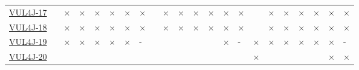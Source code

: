 \begin{table}[!htbp]
{\begin{tabular}{|l|lll|ll|ll||lll|ll|ll||lll|ll|ll|}
		\href{https://github.com/apache/httpcomponents-client/commit/0554271750599756d4946c0d7ba43d04b1a7b22}{VUL4J-17} & \cellcolor{green}\checkmark & \cellcolor{red}$\times$ & \cellcolor{red}$\times$ & \cellcolor{red}$\times$ & \cellcolor{red}$\times$ & \cellcolor{red}$\times$ & \cellcolor{red}$\times$  & \cellcolor{green}\checkmark & \cellcolor{red}$\times$ & \cellcolor{red}$\times$ & \cellcolor{red}$\times$ & \cellcolor{red}$\times$ & \cellcolor{red}$\times$ & \cellcolor{red}$\times$     & \cellcolor{green}\checkmark & \cellcolor{red}$\times$ & \cellcolor{red}$\times$ & \cellcolor{red}$\times$ & \cellcolor{red}$\times$ & \cellcolor{red}$\times$ & \cellcolor{red}$\times$\\ 
		\href{https://github.com/apache/jspwiki/commit/88d89d6523802c044cfcb7930cba40d8eeb21da2}{VUL4J-18} & \cellcolor{green}\checkmark & \cellcolor{red}$\times$ & \cellcolor{red}$\times$ & \cellcolor{red}$\times$ & \cellcolor{red}$\times$ & \cellcolor{red}$\times$ & \cellcolor{red}$\times$  & \cellcolor{green}\checkmark & \cellcolor{red}$\times$ & \cellcolor{red}$\times$ & \cellcolor{red}$\times$ & \cellcolor{red}$\times$ & \cellcolor{red}$\times$ & \cellcolor{red}$\times$     & \cellcolor{green}\checkmark & \cellcolor{red}$\times$ & \cellcolor{red}$\times$ & \cellcolor{red}$\times$ & \cellcolor{red}$\times$ & \cellcolor{red}$\times$ & \cellcolor{red}$\times$\\ 
		\href{https://github.com/bqcuong/vul4j/commit/c90825da4d28d7b1ae9b1484b9a010206be3dec5}{VUL4J-19} & \cellcolor{green}\checkmark & \cellcolor{red}$\times$ & \cellcolor{red}$\times$ & \cellcolor{red}$\times$ & \cellcolor{red}$\times$ & \cellcolor{red}$\times$ & \cellcolor{lightgray}-  & \cellcolor{green}\checkmark & \cellcolor{yellow}\halfcheckmark & \cellcolor{green}\checkmark & \cellcolor{yellow}\halfcheckmark & \cellcolor{green}\checkmark & \cellcolor{red}$\times$ & \cellcolor{lightgray}-     & \cellcolor{red}$\times$ & \cellcolor{red}$\times$ & \cellcolor{red}$\times$ & \cellcolor{red}$\times$ & \cellcolor{red}$\times$ & \cellcolor{red}$\times$ & \cellcolor{lightgray}-\\ 
		\href{https://github.com/apache/pdfbox/commit/0e14d6a42cc965e23bb1b40f04b4c002dc173b88}{VUL4J-20} & \cellcolor{green}\checkmark & \cellcolor{green}\checkmark & \cellcolor{green}\checkmark & \cellcolor{green}\checkmark & \cellcolor{green}\checkmark & \cellcolor{green}\checkmark & \cellcolor{green}\checkmark  & \cellcolor{green}\checkmark & \cellcolor{green}\checkmark & \cellcolor{green}\checkmark & \cellcolor{green}\checkmark & \cellcolor{green}\checkmark & \cellcolor{green}\checkmark & \cellcolor{green}\checkmark     & \cellcolor{red}$\times$ & \cellcolor{yellow}\halfcheckmark & \cellcolor{green}\checkmark & \cellcolor{green}\checkmark & \cellcolor{green}\checkmark & \cellcolor{red}$\times$ & \cellcolor{red}$\times$\\ 

\end{tabular}}
\end{table}
